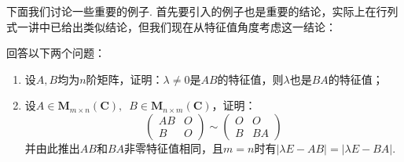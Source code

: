 下面我们讨论一些重要的例子. 首先要引入的例子也是重要的结论，实际上在行列式一讲中已给出类似结论，但我们现在从特征值角度考虑这一结论：
\begin{example}{}{}
    回答以下两个问题：
    \begin{enumerate}
        \item \label{item:18:特征值相同:1}
              设$A,B$均为$n$阶矩阵，证明：$\lambda\neq 0$是$AB$的特征值，则$\lambda$也是$BA$的特征值；

        \item \label{item:18:特征值相同:2}
              设$A\in \mathbf{M}_{m\times n}(\mathbf{C}),\enspace B\in \mathbf{M}_{n\times m}(\mathbf{C})$，证明：
              \[ \begin{pmatrix}
                      AB & O \\ B & O
                  \end{pmatrix}\sim\begin{pmatrix}
                      O & O \\ B & BA
                  \end{pmatrix} \]
              并由此推出$AB$和$BA$非零特征值相同，且$m=n$时有$|\lambda E-AB|=|\lambda E-BA|$.
    \end{enumerate}
\end{example}

